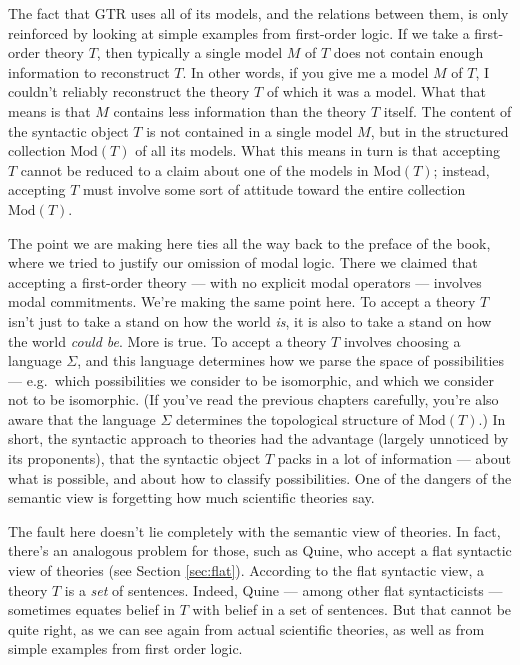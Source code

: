 The fact that GTR uses all of its models, and the relations between
them, is only reinforced by looking at simple examples from
first-order logic.  If we take a first-order theory $T$, then
typically a single model $M$ of $T$ does not contain enough
information to reconstruct $T$.  In other words, if you give me a
model $M$ of $T$, I couldn't reliably reconstruct the theory $T$ of
which it was a model.  What that means is that $M$ contains less
information than the theory $T$ itself.  The content of the syntactic
object $T$ is not contained in a single model $M$, but in the
structured collection $\mathrm{Mod}(T)$ of all its models.  What this
means in turn is that accepting $T$ cannot be reduced to a claim about
one of the models in $\mathrm{Mod}(T)$; instead, accepting $T$ must
involve some sort of attitude toward the entire collection
$\mathrm{Mod}(T)$.

The point we are making here ties all the way back to the preface of
the book, where we tried to justify our omission of modal logic.
There we claimed that accepting a first-order theory --- with no
explicit modal operators --- involves modal commitments.  We're making
the same point here.  To accept a theory $T$ isn't just to take a
stand on how the world {\it is}, it is also to take a stand on how the
world {\it could be}.  More is true.  To accept a theory $T$ involves
choosing a language $\Sigma$, and this language determines how we
parse the space of possibilities --- e.g.\ which possibilities we
consider to be isomorphic, and which we consider not to be isomorphic.
(If you've read the previous chapters carefully, you're also aware
that the language $\Sigma$ determines the topological structure of
$\mathrm{Mod}(T)$.)  In short, the syntactic approach to theories had
the advantage (largely unnoticed by its proponents), that the
syntactic object $T$ packs in a lot of information --- about what is
possible, and about how to classify possibilities.  One of the dangers
of the semantic view is forgetting how much scientific theories say.

The fault here doesn't lie completely with the semantic view of
theories.  In fact, there's an analogous problem for those, such as
Quine, who accept a flat syntactic view of theories (see Section
\ref{sec:flat}).  According to the flat syntactic view, a theory $T$
is a {\it set} of sentences.  Indeed, Quine --- among other flat
syntacticists --- sometimes equates belief in $T$ with belief in a set
of sentences.  But that cannot be quite right, as we can see again
from actual scientific theories, as well as from simple examples from
first order logic.

